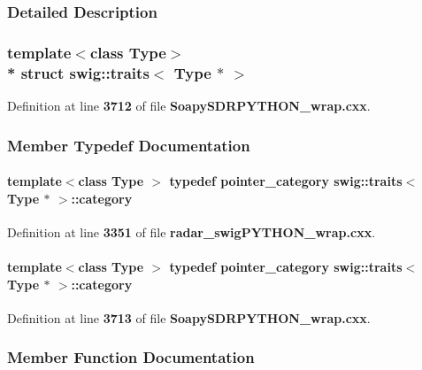 \subsubsection{Detailed Description}
\subsubsection*{template$<$class Type$>$\\*
struct swig\+::traits$<$ Type $\ast$ $>$}



Definition at line {\bf 3712} of file {\bf Soapy\+S\+D\+R\+P\+Y\+T\+H\+O\+N\+\_\+wrap.\+cxx}.



\subsubsection{Member Typedef Documentation}
\paragraph[{category}]{\setlength{\rightskip}{0pt plus 5cm}template$<$class Type $>$ typedef {\bf pointer\+\_\+category} {\bf swig\+::traits}$<$ Type $\ast$ $>$\+::{\bf category}}\label{structswig_1_1traits_3_01Type_01_5_01_4_a500d091f0454ce9f328c030b191ac18f}


Definition at line {\bf 3351} of file {\bf radar\+\_\+swig\+P\+Y\+T\+H\+O\+N\+\_\+wrap.\+cxx}.

\paragraph[{category}]{\setlength{\rightskip}{0pt plus 5cm}template$<$class Type $>$ typedef {\bf pointer\+\_\+category} {\bf swig\+::traits}$<$ Type $\ast$ $>$\+::{\bf category}}\label{structswig_1_1traits_3_01Type_01_5_01_4_a500d091f0454ce9f328c030b191ac18f}


Definition at line {\bf 3713} of file {\bf Soapy\+S\+D\+R\+P\+Y\+T\+H\+O\+N\+\_\+wrap.\+cxx}.



\subsubsection{Member Function Documentation}
